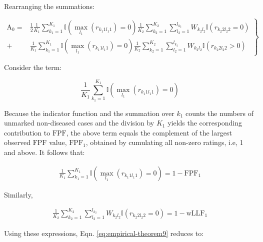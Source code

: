 \documentclass[
]{book}
\begin{document}
Rearranging the summations:

\begin{equation}
\left. 
\begin{aligned}
\text{A}_0 =& 
\frac{1}{2} \frac{1}{K_1} \sum_{k_1=1}^{K_1}\mathbb{I}\left ( \max_{l_1} \left (r_{k_1 1 l_1 1}  \right ) = 0  \right ) \frac{1}{K_2} \sum_{k_2=1}^{K_2} \sum_{l_2=1}^{l_{k_2}} W_{k_2l_2} \mathbb{I}\left ( r_{k_2 2 l_2 2} = 0 \right ) \\
+& \frac{1}{K_1} \sum_{k_1=1}^{K_1}\mathbb{I}\left ( \max_{l_1} \left (r_{k_1 1 l_1 1}  \right ) = 0  \right ) \frac{1}{K_2} \sum_{k_2=1}^{K_2} \sum_{l_2=1}^{l_{k_2}} W_{k_2l_2} \mathbb{I}\left ( r_{k_2 2 l_2 2} > 0 \right )
\end{aligned}
\right \} 
\label{eq:empirical-theorem9}
\end{equation}

Consider the term:

\begin{equation}
\frac{1}{K_1} \sum_{k_1=1}^{K_1}\mathbb{I}\left ( \max_{l_1} \left (r_{k_1 1 l_1 1}  \right ) = 0  \right )
\label{eq:empirical-theorem9a}
\end{equation}

Because the indicator function and the summation over \(k_1\) counts the numbers of unmarked non-diseased cases and the division by \(K_1\) yields the corresponding contribution to \(\text{FPF}\), the above term equals the complement of the largest observed \(\text{FPF}\) value, \(\text{FPF}_1\), obtained by cumulating all non-zero ratings, i.e, 1 and above. It follows that:

\begin{equation}
\begin{aligned}
\frac{1}{K_1}\sum_{k_1=1}^{K_1}\mathbb{I}\left ( \max_{l_1} \left (r_{k_1 1 l_1 1}  \right ) = 0  \right ) = 1 - \text{FPF}_1
\end{aligned}
\label{eq:empirical-theorem10}
\end{equation}

Similarly,

\begin{equation}
\begin{aligned}
\frac{1}{K_2}\sum_{k_2=1}^{K_2} \sum_{l_2=1}^{l_{k_2}} W_{k_2l_2} \mathbb{I}\left ( r_{k_2 2 l_2 2}  = 0  \right ) = 1 - \text{wLLF}_1
\end{aligned}
\label{eq:empirical-theorem11}
\end{equation}

Using these expressions, Eqn. \eqref{eq:empirical-theorem9} reduces to:
\end{document}
